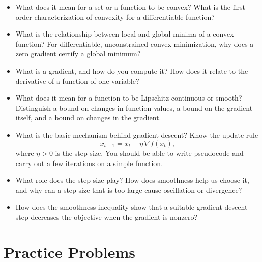 \documentclass[11  pt]{exam}
\begin{document}
	\begin{itemize}
		\item What does it mean for a set or a function to be convex? What is the first-order characterization of convexity for a differentiable function?
		\item What is the relationship between local and global minima of a convex function? For differentiable, unconstrained convex minimization, why does a zero gradient certify a global minimum?
		\item What is a gradient, and how do you compute it? How does it relate to the derivative of a function of one variable?
		\item What does it mean for a function to be Lipschitz continuous or smooth? Distinguish a bound on changes in function values, a bound on the gradient itself, and a bound on changes in the gradient.
		\item What is the basic mechanism behind gradient descent? Know the update rule
		\[x_{t+1}=x_t-\eta\,\nabla f(x_t),\]
		where $\eta>0$ is the step size. You should be able to write pseudocode and carry out a few iterations on a simple function.
		\item What role does the step size play? How does smoothness help us choose it, and why can a step size that is too large cause oscillation or divergence?
		\item How does the smoothness inequality show that a suitable gradient descent step decreases the objective when the gradient is nonzero?

	\end{itemize}

	\section{Practice Problems}
	
\end{document}
